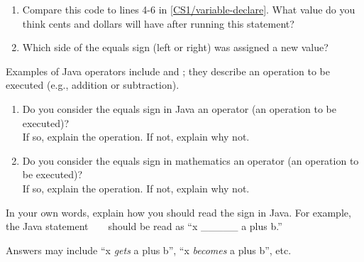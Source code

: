 \begin{enumerate}
\item Compare this code to lines 4-6 in \ref{CS1/variable-declare}.
What value do you think cents and dollars will have after running this statement?


\item Which side of the equals sign (left or right) was assigned a new value?

\end{enumerate}


\Q Examples of Java operators include \java{+} and \java{-}; they describe an operation to be executed (e.g., addition or subtraction).

\begin{enumerate}
\item Do you consider the equals sign in Java an operator (an operation to be executed)?
\\ If so, explain the operation. If not, explain why not.


\item Do you consider the equals sign in mathematics an operator (an operation to be executed)?
\\ If so, explain the operation. If not, explain why not.

\end{enumerate}


\Q In your own words, explain how you should read the \java{=} sign in Java.
For example, the Java statement ~  ~ should be read as ``x \_\_\_\_\_ a plus b.''

\begin{answer}
Answers may include ``x \emph{gets} a plus b'', ``x \emph{becomes} a plus b'', etc.
\end{answer}
